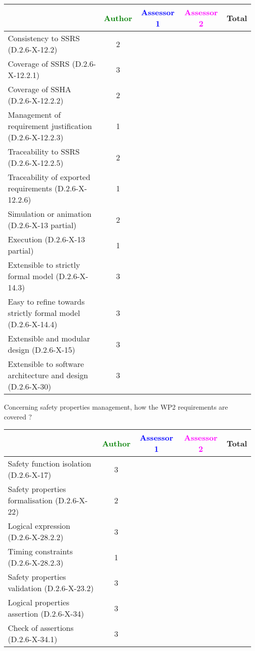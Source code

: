 \begin{tabular}{|l | c | c | c | c|}
\hline
& \textcolor{green}{Author} & \textcolor{blue}{Assessor 1} & \textcolor{magenta}{Assessor 2} & Total \\
\hline 
Consistency to SSRS (D.2.6-X-12.2) & 2 & & &  \\
\hline
Coverage of SSRS (D.2.6-X-12.2.1)  & 3 & & &  \\
\hline
Coverage of SSHA (D.2.6-X-12.2.2)  & 2 & & &  \\
\hline
Management of requirement justification (D.2.6-X-12.2.3)  & 1 & & &  \\
\hline
Traceability to  SSRS (D.2.6-X-12.2.5)  & 2 & & &  \\
\hline
Traceability of exported requirements (D.2.6-X-12.2.6)  & 1 & & &  \\
\hline
Simulation or animation (D.2.6-X-13 partial)  & 2 & & &  \\
\hline
Execution (D.2.6-X-13 partial)  & 1 & & &  \\
\hline
Extensible to strictly formal model (D.2.6-X-14.3) & 3 & & &  \\
\hline
Easy to  refine towards strictly formal model (D.2.6-X-14.4) & 3 & & &  \\
\hline
Extensible and modular design (D.2.6-X-15)  & 3 & & &  \\
\hline
Extensible to software architecture and design (D.2.6-X-30)   & 3 & & &  \\
\hline
\end{tabular}

Concerning safety properties management, how the WP2 requirements are covered ?

\begin{tabular}{|l | c | c | c | c|}
\hline
& \textcolor{green}{Author} & \textcolor{blue}{Assessor 1} & \textcolor{magenta}{Assessor 2} & Total \\
\hline 
Safety function isolation (D.2.6-X-17)  & 3 & & &  \\
\hline 
Safety properties formalisation (D.2.6-X-22)  & 2 & & &  \\
\hline
Logical expression (D.2.6-X-28.2.2)  & 3 & & &  \\
\hline
Timing constraints (D.2.6-X-28.2.3)  & 1 & & &  \\
\hline
Safety properties validation (D.2.6-X-23.2)  & 3 & & &  \\
\hline
Logical properties assertion (D.2.6-X-34)  &  3 & & &  \\
\hline
Check  of assertions (D.2.6-X-34.1)  & 3 & & &  \\
\hline
\end{tabular}

